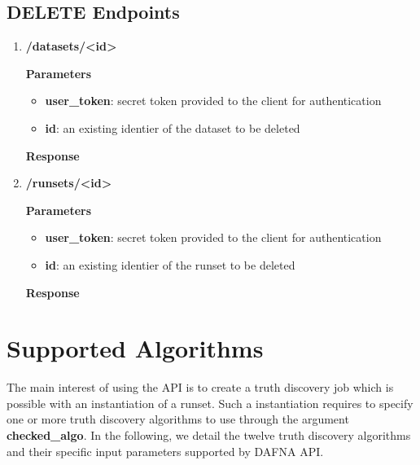 \documentclass[a4paper,10pt]{scrartcl}
\begin{document}
\subsection{DELETE Endpoints}
\begin{enumerate}
\item \textbf{/datasets/<id>}
\textbf{Parameters}
\begin{itemize}
 \item \textbf{user\_token}: secret token provided to the client for authentication
 \item \textbf{id}: an existing identier of the dataset to be deleted 
\end{itemize}
\textbf{Response}
%
\item \textbf{/runsets/<id>}
\textbf{Parameters}
\begin{itemize}
  \item \textbf{user\_token}: secret token provided to the client for authentication
 \item \textbf{id}: an existing identier of the runset to be deleted 
\end{itemize}
\textbf{Response}
\end{enumerate}

\section{Supported Algorithms}\label{algorithms}
The main interest of using the API is to create a truth discovery job which is possible with an instantiation 
of a runset. Such a instantiation requires to specify one or more truth discovery algorithms to use through the
argument \textbf{checked\_algo}. In the following, we detail the twelve truth discovery algorithms 
and their specific input parameters supported by DAFNA API. 
\end{document}
